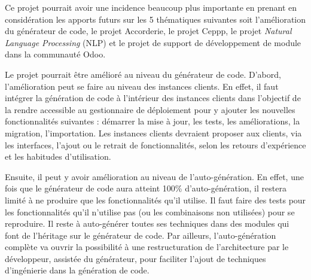 
Ce projet pourrait avoir une incidence beaucoup plus importante en prenant en considération les apports futurs sur les 5 thématiques suivantes soit l'amélioration du générateur de code, le projet Accorderie, le projet Ceppp, le projet \textit{Natural Language Processing} (NLP) et le projet de support de développement de module dans la communauté Odoo.



Le projet pourrait être amélioré au niveau du générateur de code.
D'abord, l'amélioration peut se faire au niveau des instances clients. En effet, il faut intégrer la génération de code à l’intérieur des instances clients dans l’objectif de la rendre accessible au gestionnaire de déploiement pour y ajouter les nouvelles fonctionnalités suivantes : démarrer la mise à jour, les tests, les améliorations, la migration, l'importation. Les instances clients devraient proposer aux clients, via les interfaces, l'ajout ou le retrait de fonctionnalités, selon les retours d'expérience et les habitudes d'utilisation.






Ensuite, il peut y avoir amélioration au niveau de l'auto-génération. En effet, une fois que le générateur de code aura atteint 100\% d’auto-génération, il restera limité à ne produire que les fonctionnalités qu’il utilise. Il faut faire des tests pour les fonctionnalités qu’il n’utilise pas (ou les combinaisons non utilisées) pour se reproduire. Il reste à auto-générer toutes ses techniques dans des modules qui font de l'héritage sur le générateur de code. Par ailleurs, l'auto-génération complète va ouvrir la possibilité à une restructuration de l'architecture par le développeur, assistée du générateur, pour faciliter l'ajout de techniques d'ingénierie dans la génération de code.

